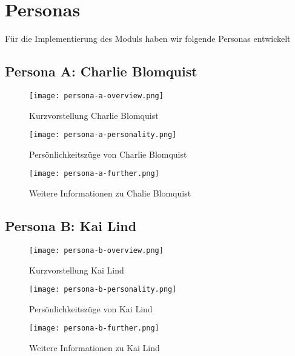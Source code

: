 \chapter{Personas}

Für die Implementierung des Moduls haben wir folgende Personas entwickelt

\section{Persona A: Charlie Blomquist}

\begin{figure}[H]
	\centering
	\texttt{[image: persona-a-overview.png]}
    \caption{Kurzvorstellung Charlie Blomquist}
	\label{fig:personaashort}
\end{figure}

\begin{figure}[H]
	\centering
	\texttt{[image: persona-a-personality.png]}
    \caption{Persönlichkeitszüge von Charlie Blomquist}
	\label{fig:personaapers}
\end{figure}

\begin{figure}[H]
	\centering
	\texttt{[image: persona-a-further.png]}
    \caption{Weitere Informationen zu Chalie Blomquist}
	\label{fig:personaafurther}
\end{figure}

\section{Persona B: Kai Lind}

\begin{figure}[H]
	\centering
	\texttt{[image: persona-b-overview.png]}
    \caption{Kurzvorstellung Kai Lind}
	\label{fig:personabshort}
\end{figure}

\begin{figure}[H]
	\centering
	\texttt{[image: persona-b-personality.png]}
    \caption{Persönlichkeitszüge von Kai Lind}
	\label{fig:personabpers}
\end{figure}

\begin{figure}[H]
	\centering
	\texttt{[image: persona-b-further.png]}
    \caption{Weitere Informationen zu Kai Lind}
	\label{fig:personabfurther}
\end{figure}


